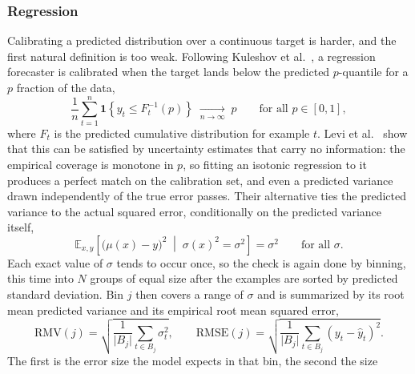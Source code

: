     \subsubsection{Regression}
        Calibrating a predicted distribution over a continuous target is harder, and
        the first natural definition is too weak. Following Kuleshov et
        al.~\cite{kuleshov2018}, a regression forecaster is calibrated when the target
        lands below the predicted $p$-quantile for a $p$ fraction of the data,
        \begin{equation}
            \frac{1}{n} \sum_{t=1}^{n} \mathbf{1}\!\left\{ y_t \le F_t^{-1}(p) \right\}
            \;\xrightarrow[n \to \infty]{}\; p
            \qquad \text{for all } p \in [0, 1],
            \label{eq:bg:unc:calibreg}
        \end{equation}
        where $F_t$ is the predicted cumulative distribution for example $t$. Levi et
        al.~\cite{levi2022} show that this can be satisfied by uncertainty estimates
        that carry no information: the empirical coverage is monotone in $p$, so
        fitting an isotonic regression to it produces a perfect match on the
        calibration set, and even a predicted variance drawn independently of the true
        error passes. Their alternative ties the predicted variance to the actual
        squared error, conditionally on the predicted variance itself,
        \begin{equation}
            \mathbb{E}_{x, y}\!\left[ \bigl( \mu(x) - y \bigr)^{2}
            \;\middle|\; \sigma(x)^{2} = \sigma^{2} \right] = \sigma^{2}
            \qquad \text{for all } \sigma .
            \label{eq:bg:unc:varcalib}
        \end{equation}
        Each exact value of $\sigma$ tends to occur once, so the check is again done by
        binning, this time into $N$ groups of equal size after the examples are sorted
        by predicted standard deviation. Bin $j$ then covers a range of $\sigma$ and is
        summarized by its root mean predicted variance and its empirical root mean
        squared error,
        \begin{equation}
            \mathrm{RMV}(j) = \sqrt{ \frac{1}{\lvert B_j \rvert} \sum_{t \in B_j} \sigma_t^{2} },
            \qquad
            \mathrm{RMSE}(j) = \sqrt{ \frac{1}{\lvert B_j \rvert} \sum_{t \in B_j} (y_t - \hat{y}_t)^{2} } .
            \label{eq:bg:unc:rmvrmse}
        \end{equation}
        The first is the error size the model expects in that bin, the second the size

